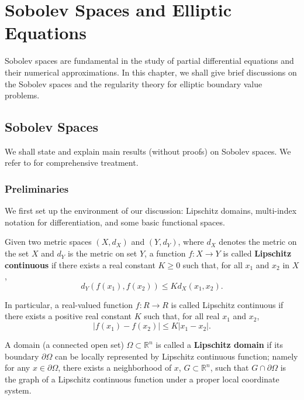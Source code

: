 \chapter{Sobolev Spaces and Elliptic Equations}

Sobolev spaces are fundamental in the study of partial differential equations and their
numerical approximations. In this chapter, we shall give brief discussions on the Sobolev
spaces and the regularity theory for elliptic boundary value problems.


\section{Sobolev Spaces}

We shall state and explain main results (without proofs) on Sobolev spaces. We refer to
\cite{Adams1975,Brezis2011} for comprehensive treatment.

\subsection{Preliminaries}
We first set up the environment of our discussion: Lipschitz domains,
multi-index notation for differentiation, and some basic functional spaces.


Given two metric spaces $(X, d_X)$ and $(Y, d_Y)$, where $d_X$ denotes the metric on the set $X$ and $d_Y$ is the metric on set $Y$, a function $f : X \to Y$ is called \textbf{Lipschitz continuous} if there exists a real constant $K\geq 0$ such that, for all $x_1$ and $x_2$ in $X$,
\[
d_{Y}(f(x_{1}),f(x_{2}))\leq Kd_{X}(x_{1},x_{2}).
\]

In particular, a real-valued function $f : R \to R$ is called Lipschitz continuous if there exists a positive real constant $K$ such that, for all real $x_1$ and $x_2$,
\[
|f(x_{1})-f(x_{2})|\leq K|x_{1}-x_{2}|.
\]

A domain (a connected open set) $\Omega\subset\mathbb R^n$ is called a \textbf{Lipschitz domain} if its boundary
$\partial\Omega$ can be locally represented by Lipschitz continuous function; namely for any $x\in\partial\Omega$,
there exists a neighborhood of $x$, $G\subset \mathbb R^n$, such that $G\cap\partial\Omega$ is the graph of a Lipschitz
continuous function under a proper local coordinate system.

